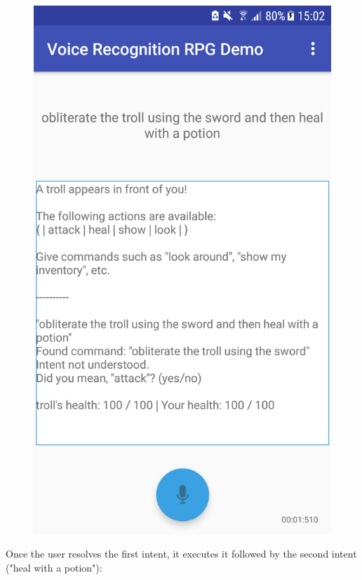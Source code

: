 \documentclass[11pt]{article}
\begin{document}
\begin{center}
\begin{figure}[H]
\begin{center}
  \includegraphics[scale=0.25]{Screenshot_20180527-150212.png}
  \label{fig:snapshot-multiple-command-1}
  \end{center}
\end{figure}
\end{center}

\newpage
Once the user resolves the first intent, it executes it followed by the second intent ("heal with a potion"):
\end{document}
